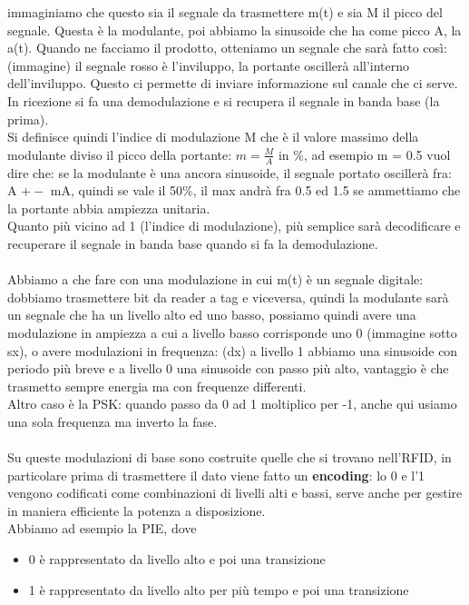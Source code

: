 \documentclass[oneside, 12pt]{extbook}
\begin{document}
immaginiamo che questo sia il segnale da trasmettere m(t) e sia M il picco del segnale. Questa è la modulante, poi abbiamo la sinusoide che ha come picco A, la a(t). Quando ne facciamo il prodotto, otteniamo un segnale che sarà fatto così: (immagine) il segnale rosso è l'inviluppo, la portante oscillerà all'interno dell'inviluppo. Questo ci permette di inviare informazione sul canale che ci serve. In ricezione si fa una demodulazione e si recupera il segnale in banda base (la prima).\\Si definisce quindi l'indice di modulazione M che è il valore massimo della modulante diviso il picco della portante: $m = \frac{M}{A}$ in \%, ad esempio m = 0.5 vuol dire che: se la modulante è una ancora sinusoide, il segnale portato oscillerà fra: A $+-$ mA, quindi se vale il 50\%, il max andrà fra 0.5 ed 1.5 se ammettiamo che la portante abbia ampiezza unitaria.\\Quanto più vicino ad 1 (l'indice di modulazione), più semplice sarà decodificare e recuperare il segnale in banda base quando si fa la demodulazione.\\\\Abbiamo a che fare con una modulazione in cui m(t) è un segnale digitale: dobbiamo trasmettere bit da reader a tag e viceversa, quindi la modulante sarà un segnale che ha un livello alto ed uno basso, possiamo quindi avere una modulazione in ampiezza a cui a livello basso corrisponde uno 0 (immagine sotto sx), o avere modulazioni in frequenza: (dx) a livello 1 abbiamo una sinusoide con periodo più breve e a livello 0 una sinusoide con passo più alto, vantaggio è che trasmetto sempre energia ma con frequenze differenti.\\Altro caso è la PSK: quando passo da 0 ad 1 moltiplico per -1, anche qui usiamo una sola frequenza ma inverto la fase.\\\\Su queste modulazioni di base sono costruite quelle che si trovano nell'RFID, in particolare prima di trasmettere il dato viene fatto un \textbf{encoding}: lo 0 e l'1 vengono codificati come combinazioni di livelli alti e bassi, serve anche per gestire in maniera efficiente la potenza a disposizione.\\Abbiamo ad esempio la PIE, dove 
\begin{itemize}
	\item 0 è rappresentato da livello alto e poi una transizione
	\item 1 è rappresentato da livello alto per più tempo e poi una transizione
\end{itemize}
\end{document}
